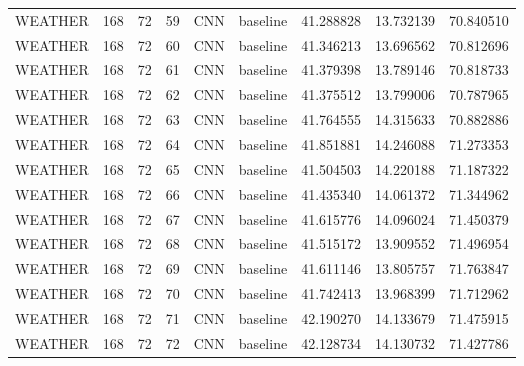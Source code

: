 \begin{table}
\begin{tabular}{lrrrllrrr}
WEATHER & 168 & 72 & 59 & CNN & baseline & 41.288828 & 13.732139 & 70.840510 \\
WEATHER & 168 & 72 & 60 & CNN & baseline & 41.346213 & 13.696562 & 70.812696 \\
WEATHER & 168 & 72 & 61 & CNN & baseline & 41.379398 & 13.789146 & 70.818733 \\
WEATHER & 168 & 72 & 62 & CNN & baseline & 41.375512 & 13.799006 & 70.787965 \\
WEATHER & 168 & 72 & 63 & CNN & baseline & 41.764555 & 14.315633 & 70.882886 \\
WEATHER & 168 & 72 & 64 & CNN & baseline & 41.851881 & 14.246088 & 71.273353 \\
WEATHER & 168 & 72 & 65 & CNN & baseline & 41.504503 & 14.220188 & 71.187322 \\
WEATHER & 168 & 72 & 66 & CNN & baseline & 41.435340 & 14.061372 & 71.344962 \\
WEATHER & 168 & 72 & 67 & CNN & baseline & 41.615776 & 14.096024 & 71.450379 \\
WEATHER & 168 & 72 & 68 & CNN & baseline & 41.515172 & 13.909552 & 71.496954 \\
WEATHER & 168 & 72 & 69 & CNN & baseline & 41.611146 & 13.805757 & 71.763847 \\
WEATHER & 168 & 72 & 70 & CNN & baseline & 41.742413 & 13.968399 & 71.712962 \\
WEATHER & 168 & 72 & 71 & CNN & baseline & 42.190270 & 14.133679 & 71.475915 \\
WEATHER & 168 & 72 & 72 & CNN & baseline & 42.128734 & 14.130732 & 71.427786 \\
\bottomrule
\end{tabular}
\end{table}
